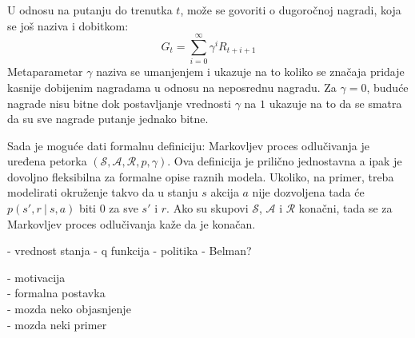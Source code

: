 U odnosu na putanju do trenutka $t$, može se govoriti o dugoročnoj nagradi, koja se još naziva i dobitkom:
\begin{equation}
	G_t = \sum_{i=0}^{\infty} \gamma^iR_{t+i+1}
\end{equation}
Metaparametar $\gamma$ naziva se umanjenjem i ukazuje na to koliko se značaja pridaje kasnije dobijenim nagradama u odnosu na neposrednu nagradu. Za $\gamma = 0$, buduće nagrade nisu bitne dok postavljanje vrednosti $\gamma$ na $1$ ukazuje na to da se smatra da su sve nagrade putanje jednako bitne.
\par 
Sada je moguće dati formalnu definiciju: Markovljev proces odlučivanja je uređena petorka $(\mathcal{S}, \mathcal{A}, \mathcal{R}, p, \gamma)$. Ova definicija je prilično jednostavna a ipak je dovoljno fleksibilna za formalne opise raznih modela. Ukoliko, na primer, treba modelirati okruženje takvo da u stanju $s$ akcija $a$ nije dozvoljena tada će $p(s', r ~|~ s, a)$ biti $0$ za sve $s'$ i $r$. Ako su skupovi $\mathcal{S}$, $\mathcal{A}$ i $\mathcal{R}$ konačni, tada se za Markovljev proces odlučivanja kaže da je konačan.
\par 
- vrednost stanja
- q funkcija
- politika
- Belman?


- motivacija \\
- formalna postavka \\
- mozda neko objasnjenje \\
- mozda neki primer \\